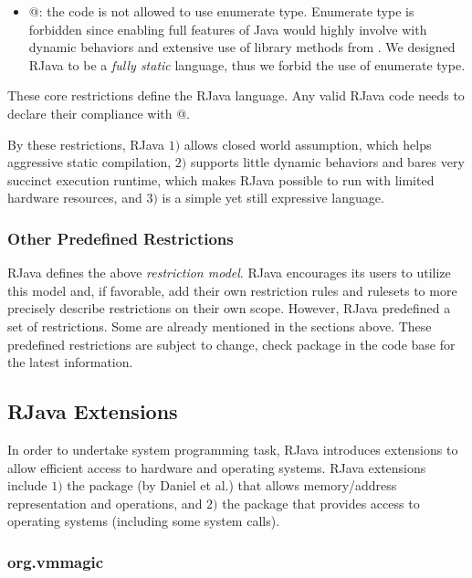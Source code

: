 \documentclass[12pt]{article}
\begin{document}
\begin{itemize}
\item
@:
the code is not allowed to use enumerate type. Enumerate
type is forbidden since enabling full features of 
Java  would highly involve with dynamic behaviors
and extensive use of library methods from 
. We designed RJava to be 
a \emph{fully static} language, thus we forbid the 
use of enumerate type. 

\end{itemize}

These core restrictions define the RJava language. Any valid
RJava code needs to declare their compliance with @. 

By these restrictions, RJava $1)$ allows closed world assumption, 
which helps aggressive static compilation, $2)$ supports little dynamic behaviors
and bares very succinct execution runtime, which makes RJava possible to 
run with limited hardware resources, and $3)$ is a simple yet still expressive
language. 

\subsubsection{Other Predefined Restrictions}
RJava defines the above \emph{restriction model}. 
RJava encourages its users to utilize this model and, if favorable, add 
their own restriction rules and rulesets to more precisely describe
restrictions on their own scope. However, RJava predefined a set
of restrictions. Some are already mentioned in the sections above. 
These predefined restrictions are subject to change, check 
 package in the code base for
the latest information. 

\subsection{RJava Extensions}

In order to undertake system programming task, RJava introduces
extensions to allow efficient access to hardware and operating 
systems. RJava extensions include $1)$ the 
package (by Daniel et al.) that allows memory/address representation and operations,
and $2)$ the  package that provides 
access to operating systems (including some system calls). 

\subsubsection{org.vmmagic}
\end{document}
